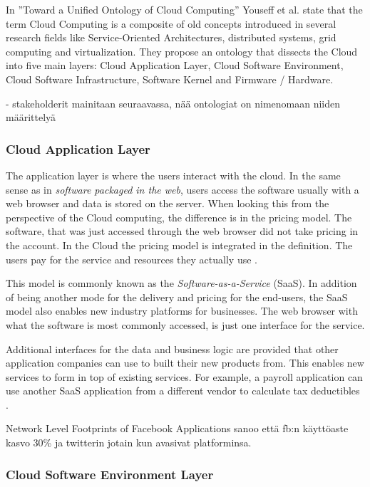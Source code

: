 \documentclass{tktltiki}
\begin{document}
In ''Toward a Unified Ontology of Cloud Computing'' Youseff et al. \cite{unified_ontology} state that the term Cloud Computing is a composite of old concepts introduced in several research fields like Service-Oriented Architectures, distributed systems, grid computing and virtualization.  They propose an ontology that dissects the Cloud into five main layers: Cloud Application Layer, Cloud Software Environment, Cloud Software Infrastructure, Software Kernel and Firmware / Hardware.  

- stakeholderit mainitaan seuraavassa, nää ontologiat on nimenomaan niiden määrittelyä


\subsubsection{Cloud Application Layer}

The application layer is where the users interact with the cloud.  In the same sense as in \emph{software packaged in the web}, users access the software usually with a web browser and data is stored on the server.  When looking this from the perspective of the Cloud computing, the difference is in the pricing model.  The software, that was just accessed through the web browser did not take pricing in the account.  In the Cloud the pricing model is integrated in the definition.  The users pay for the service and resources they actually use \cite{Cusumano10}. 

This model is commonly known as the \emph{Software-as-a-Service} (SaaS).  In addition of being another mode for the delivery and pricing for the end-users, the SaaS model also enables new industry platforms for businesses.  The web browser with what the software is most commonly accessed, is just one interface for the service.  

Additional interfaces for the data and business logic are provided that other application companies can use to built their new products from.  This enables new services to form in top of existing services.  For example, a payroll application can use another SaaS application from a different vendor to calculate tax deductibles \cite{Cusumano10, unified_ontology}.

Network Level Footprints of Facebook Applications sanoo että fb:n käyttöaste kasvo 30\% ja twitterin jotain kun avasivat platforminsa.



\subsubsection{Cloud Software Environment Layer}
\end{document}

